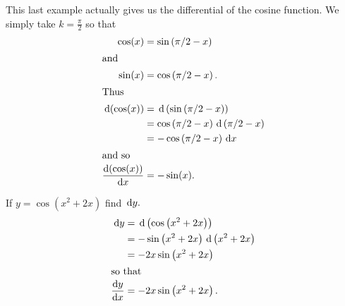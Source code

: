 This  last example actually gives us the differential of the
cosine function. We simply take $k=\frac{\pi}{2}$ so that 
\begin{align*}
  \cos(x) &= \sin\left(\pi/2-x\right)\\
\intertext{and}
  \sin(x) &= \cos\left(\pi/2-x\right).\\
\intertext{Thus}
\thinspace{\rm d}(\cos(x))&= \thinspace{\rm d}\left(\sin\left(\pi/2-x\right)\right)\\
          &=\cos\left(\pi/2-x\right)\thinspace{\rm d}\left(\pi/2-x\right)\\
          &=-\cos\left(\pi/2-x\right)\thinspace{\rm d}x\\
\intertext{and so}
\frac{\text{d}{(\cos(x))}}{\text{d}{x}}&=-\sin(x).
\end{align*}

\begin{myexample}{}
  If \(y=\cos\left(x^2+2x\right)\) find $\thinspace{\rm d}y.$
  \begin{align*}
    \thinspace{\rm d}y &= \thinspace{\rm d}\left(\cos\left(x^2+2x\right)\right)\\
         &=-\sin\left(x^2+2x\right)\thinspace{\rm d}\left(x^2+2x\right)\\
         &=-2x\sin\left(x^2+2x\right)\\
\intertext{so that}
    \frac{\text{d}{ y}}{\text{d}{x}} &=-2x\sin\left(x^2+2x\right).
  \end{align*}
\end{myexample}


